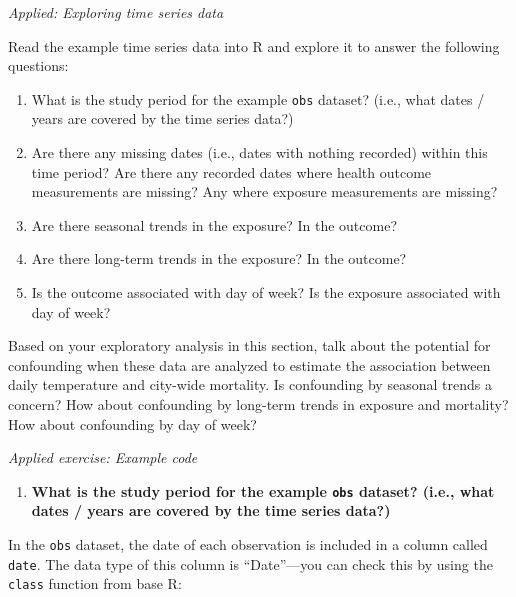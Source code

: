 \documentclass[
]{book}
\newenvironment{Shaded}{\begin{snugshade}}{\end{snugshade}}
\newcommand{\KeywordTok}[1]{\textcolor[rgb]{0.13,0.29,0.53}{\textbf{#1}}}
\newcommand{\NormalTok}[1]{#1}
\newcommand{\OperatorTok}[1]{\textcolor[rgb]{0.81,0.36,0.00}{\textbf{#1}}}
\providecommand{\tightlist}{%
  \setlength{\itemsep}{0pt}\setlength{\parskip}{0pt}}
\begin{document}
\emph{Applied: Exploring time series data}

Read the example time series data into R and explore it to answer the following
questions:

\begin{enumerate}
\def\labelenumi{\arabic{enumi}.}
\tightlist
\item
  What is the study period for the example \texttt{obs} dataset? (i.e., what
  dates / years are covered by the time series data?)
\item
  Are there any missing dates (i.e., dates with nothing recorded) within this time
  period? Are there any recorded dates where health outcome measurements are missing?
  Any where exposure measurements are missing?
\item
  Are there seasonal trends in the exposure? In the outcome?
\item
  Are there long-term trends in the exposure? In the outcome?
\item
  Is the outcome associated with day of week? Is the exposure associated
  with day of week?
\end{enumerate}

Based on your exploratory analysis in this section, talk about the potential
for confounding when these data are analyzed to estimate the association between
daily temperature and city-wide mortality. Is confounding by seasonal trends
a concern? How about confounding by long-term trends in exposure and mortality?
How about confounding by day of week?

\emph{Applied exercise: Example code}

\begin{enumerate}
\def\labelenumi{\arabic{enumi}.}
\tightlist
\item
  \textbf{What is the study period for the example \texttt{obs} dataset? (i.e., what
  dates / years are covered by the time series data?)}
\end{enumerate}

In the \texttt{obs} dataset, the date of each observation is included in a column called
\texttt{date}. The data type of this column is ``Date''---you can check this by using
the \texttt{class} function from base R:

\begin{Shaded}
\end{Shaded}
\end{document}
